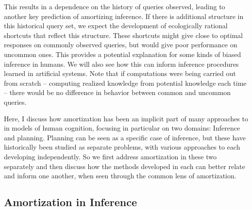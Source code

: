 This results in a dependence on the history of queries observed, leading to another key prediction of amortizing inference. If there is additional structure in this historical query set, we expect the development of ecologically rational shortcuts that reflect this structure. These shortcuts might give close to optimal responses on commonly observed queries, but would give poor performance on uncommon ones. This provides a potential explanation for some kinds of biased inference in humans. We will also see how this can inform inference procedures learned in artificial systems. Note that if computations were being carried out from scratch -- computing realized knowledge from potential knowledge each time -- there would be no difference in behavior between common and uncommon queries.

Here, I discuss how amortization has been an implicit part of many approaches to  in models of human cognition, focusing in particular on two domains: Inference and planning. Planning can be seen as a specific case of inference\citep{botvinick2012planning}, but these have historically been studied as separate problems, with various approaches to each developing independently. So we first address amortization in these two separately and then discuss how the methods developed in each can better relate and inform one another, when seen through the common lens of amortization.


\subsection{Amortization in Inference}


